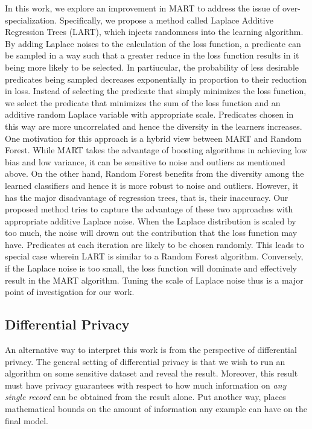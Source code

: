 \documentclass{article} %
\begin{document}
In this work, we explore an improvement in MART to address the issue of over-specialization. Specifically, we propose a method called Laplace Additive Regression Trees (LART), which injects randomness into the learning algorithm.
By adding Laplace noises to the calculation of the loss function, a predicate can be sampled in a way such that a greater reduce in the loss function results in it being more likely to be selected. In partiucular, the probability of less desirable predicates being sampled decreases exponentially in proportion to their reduction in loss. Instead of selecting the predicate that simply minimizes the loss function, we select the predicate that minimizes the sum of the loss function and an additive random Laplace variable with appropriate scale. Predicates chosen in this way are more uncorrelated and hence the diversity in the learners increases.\\

One motivation for this approach is a hybrid view between MART and Random Forest. While MART takes the advantage of boosting algorithms in achieving low bias and low variance, it can be sensitive to noise and outliers as mentioned above. On the other hand, Random Forest benefits from the diversity among the learned classifiers and hence it is more robust to noise and outliers. However, it has the major disadvantage of regression trees, that is, their inaccuracy. Our proposed method tries to capture the advantage of these two approaches with appropriate additive Laplace noise. When the Laplace distribution is scaled by too much, the noise will drown out the contribution that the loss function may have. Predicates at each iteration are likely to be chosen randomly. This leads to special case wherein LART is similar to a Random Forest algorithm. Conversely, if the Laplace noise is too small, the loss function will dominate and effectively result in the MART algorithm. Tuning the scale of Laplace noise thus is a major point of investigation for our work.



\subsection{Differential Privacy }

An alternative way to interpret this work is from the perspective of differential privacy. The general setting of differential privacy is that we wish to run an algorithm on some sensitive dataset and reveal the result. Moreover, this result must have privacy guarantees with respect to how much information on \emph{any single record} can be obtained from the result alone. Put another way, places mathematical bounds on the amount of information any example can have on the final model.
\end{document}
